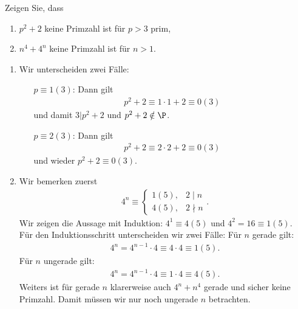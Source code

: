 
\begin{exercise}

Zeigen Sie, dass

\begin{enumerate}
  \item $p^2 + 2$ keine Primzahl ist für $p > 3$ prim,
  \item $n^4 + 4^n$ keine Primzahl ist für $n > 1$.
\end{enumerate}

\end{exercise}


\begin{solution}

\phantom{}

\begin{enumerate}
  \item Wir unterscheiden zwei Fälle:
  \begin{itemize}
    \item[$p \equiv 1 (3)$:]
    Dann gilt
    \begin{align*}
      p^2 + 2 \equiv 1 \cdot 1 + 2 \equiv 0 (3)
    \end{align*}
    und damit $3 | p^2 + 2$ und $p^2 + 2 \notin \P$.
    \item[$p \equiv 2 (3)$:]
    Dann gilt
    \begin{align*}
      p^2 + 2 \equiv 2 \cdot 2 + 2 \equiv 0 (3)
    \end{align*}
    und wieder $p^2 + 2 \equiv 0 (3)$.
  \end{itemize}
  \item Wir bemerken zuerst
  \begin{align*}
    4^n \equiv \begin{cases}
      1(5), & 2\mid n \\
      4(5), & 2\nmid n
    \end{cases}.
  \end{align*}
  Wir zeigen die Aussage mit Induktion: $4^1 \equiv 4(5)$
  und $4^2 = 16 \equiv 1(5)$. \\
  Für den Induktionsschritt unterscheiden wir zwei Fälle:
  Für $n$ gerade gilt:
  \begin{align*}
    4^n = 4^{n-1}\cdot 4 \equiv 4\cdot 4 \equiv 1 (5).
  \end{align*}
  Für $n$ ungerade gilt:
  \begin{align*}
    4^n = 4^{n-1}\cdot 4 \equiv 1\cdot 4 \equiv 4 (5).
  \end{align*}
  Weiters ist für gerade $n$ klarerweise auch $4^n + n^4$
  gerade und sicher keine Primzahl.
  Damit müssen wir nur noch ungerade $n$ betrachten.


\end{enumerate}
\end{solution}
